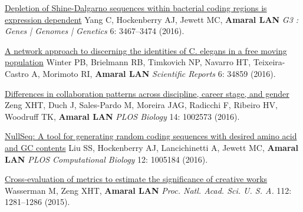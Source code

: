 \NumberedItem{\makebox[0.8cm][r]{[119]}}
\href{/people/amaral/depletion-shine-dalgarno-sequences-within-bacterial-coding-regions-expression-dependent}
{Depletion of Shine-Dalgarno sequences within bacterial coding regions is expression dependent}
\newline
Yang C, Hockenberry AJ, Jewett MC, {\textbf{Amaral LAN}}
\newline
\textit{G3 : Genes | Genomes | Genetics}
    6:
3467--3474 (2016).
\newline
\Gap
~
\Gap

\NumberedItem{\makebox[0.8cm][r]{[118]}}
\href{/people/amaral/network-approach-discerning-identities-c-elegans-free-moving-population}
{A network approach to discerning the identities of C. elegans in a free moving population}
\newline
Winter PB, Brielmann RB, Timkovich NP, Navarro HT, Teixeira-Castro A, Morimoto RI, {\textbf{Amaral LAN}}
\newline
\textit{Scientific Reports}
    6:
34859 (2016).
\newline
\Gap
~
\Gap

\NumberedItem{\makebox[0.8cm][r]{[117]}}
\href{/people/amaral/differences-collaboration-patterns-across-discipline-career-stage-and-gender}
{Differences in collaboration patterns across discipline, career stage, and gender}
\newline
Zeng XHT, Duch J, Sales-Pardo M, Moreira JAG, Radicchi F, Ribeiro HV, Woodruff TK, {\textbf{Amaral LAN}}
\newline
\textit{PLOS Biology}
    14:
1002573 (2016).
\newline
\Gap
~
\Gap

\NumberedItem{\makebox[0.8cm][r]{[116]}}
\href{/people/amaral/nullseq-tool-generating-random-coding-sequences-desired-amino-acid-and-gc-contents}
{NullSeq: A tool for generating random coding sequences with desired amino acid and GC contents}
\newline
Liu SS, Hockenberry AJ, Lancichinetti A, Jewett MC, {\textbf{Amaral LAN}}
\newline
\textit{PLOS Computational Biology}
    12:
1005184 (2016).
\newline
\Gap
~
\Gap

\NumberedItem{\makebox[0.8cm][r]{[115]}}
\href{/people/amaral/cross-evaluation-metrics-estimate-significance-creative-works}
{Cross-evaluation of metrics to estimate the significance of creative works}
\newline
Wasserman M, Zeng XHT, {\textbf{Amaral LAN}}
\newline
\textit{Proc. Natl. Acad. Sci. U. S. A.}
    112:
1281--1286 (2015).
\newline
\Gap
~
\Gap

